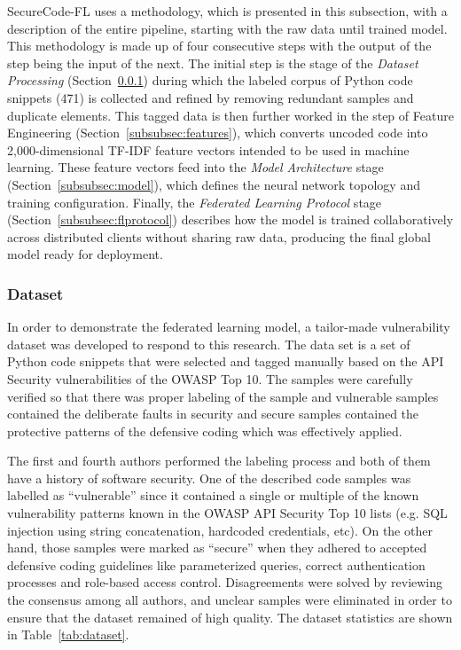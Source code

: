 \documentclass[pdflatex,sn-mathphys-num]{sn-jnl}
\theoremstyle{thmstyleone}%
\theoremstyle{thmstyletwo}%
\theoremstyle{thmstylethree}%
\begin{document}
SecureCode-FL uses a methodology, which is presented in this subsection, with a description of the entire pipeline, starting with the raw data until trained model. This methodology is made up of four consecutive steps with the output of the step being the input of the next. The initial step is the stage of the \textit{Dataset Processing} (Section~\ref{subsubsec:dataset}) during which the labeled corpus of Python code snippets (471) is collected and refined by removing redundant samples and duplicate elements. This tagged data is then further worked in the step of Feature Engineering (Section~\ref{subsubsec:features}), which converts uncoded code into 2,000-dimensional TF-IDF feature vectors intended to be used in machine learning. These feature vectors feed into the \textit{Model Architecture} stage (Section~\ref{subsubsec:model}), which defines the neural network topology and training configuration. Finally, the \textit{Federated Learning Protocol} stage (Section~\ref{subsubsec:flprotocol}) describes how the model is trained collaboratively across distributed clients without sharing raw data, producing the final global model ready for deployment.

\subsubsection{Dataset}\label{subsubsec:dataset}

In order to demonstrate the federated learning model, a tailor-made vulnerability dataset was developed to respond to this research. The data set is a set of Python code snippets that were selected and tagged manually based on the API Security vulnerabilities of the OWASP Top 10. The samples were carefully verified so that there was proper labeling of the sample and vulnerable samples contained the deliberate faults in security and secure samples contained the protective patterns of the defensive coding which was effectively applied.

The first and fourth authors performed the labeling process and both of them have a history of software security. One of the described code samples was labelled as ``vulnerable'' since it contained a single or multiple of the known vulnerability patterns known in the OWASP API Security Top 10 lists (e.g. SQL injection using string concatenation, hardcoded credentials, etc). On the other hand, those samples were marked as ``secure'' when they adhered to accepted defensive coding guidelines like parameterized queries, correct authentication processes and role-based access control. Disagreements were solved by reviewing the consensus among all authors, and unclear samples were eliminated in order to ensure that the dataset remained of high quality. The dataset statistics are shown in Table~\ref{tab:dataset}.
\end{document}
